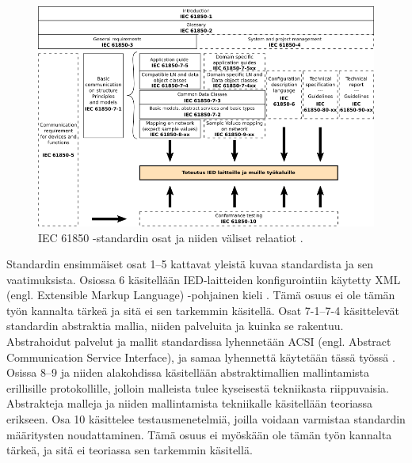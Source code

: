 \begin{figure}
	\includegraphics[width=1\textwidth]{pictures/iec61850-series-parts-and-relations.png}
	\caption{IEC 61850 -standardin osat ja niiden väliset relaatiot \cite[s.~14]{IEC61850-7-1} \cite[s.~22]{IEC61850-1}.}
	\label{fig:iec61850-osat-ja-relaatiot}
\end{figure}

Standardin ensimmäiset osat 1--5 kattavat yleistä kuvaa standardista ja sen vaatimuksista. Osiossa 6 käsitellään IED-laitteiden konfigurointiin käytetty XML (engl. Extensible Markup Language) -pohjainen kieli \cite[s.~7--8]{IEC61850-6}. Tämä osuus ei ole tämän työn kannalta tärkeä ja sitä ei sen tarkemmin käsitellä. Osat 7-1--7-4 käsittelevät standardin abstraktia mallia, niiden palveluita ja kuinka se rakentuu. Abstrahoidut palvelut ja mallit standardissa lyhennetään ACSI (engl. Abstract Communication Service Interface), ja samaa lyhennettä käytetään tässä työssä \cite[s.~72]{IEC61850-7-1}. Osissa 8--9 ja niiden alakohdissa käsitellään abstraktimallien mallintamista erillisille protokollille, jolloin malleista tulee kyseisestä tekniikasta riippuvaisia. Abstrakteja malleja ja niiden mallintamista tekniikalle käsitellään teoriassa erikseen. Osa 10 käsittelee testausmenetelmiä, joilla voidaan varmistaa standardin määritysten noudattaminen. Tämä osuus ei myöskään ole tämän työn kannalta tärkeä, ja sitä ei teoriassa sen tarkemmin käsitellä. \cite[s.~15]{IEC61850-7-1}


